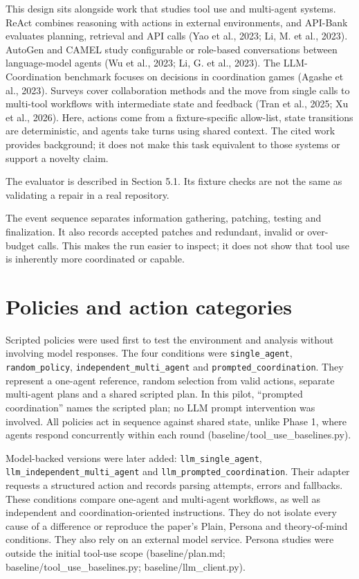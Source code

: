 \documentclass[12pt,a4paper,oneside]{report}
\begin{document}
This design sits alongside work that studies tool use and multi-agent systems. ReAct combines reasoning with actions in external environments, and API-Bank evaluates planning, retrieval and API calls (Yao et al., 2023; Li, M. et al., 2023). AutoGen and CAMEL study configurable or role-based conversations between language-model agents (Wu et al., 2023; Li, G. et al., 2023). The LLM-Coordination benchmark focuses on decisions in coordination games (Agashe et al., 2023). Surveys cover collaboration methods and the move from single calls to multi-tool workflows with intermediate state and feedback (Tran et al., 2025; Xu et al., 2026). Here, actions come from a fixture-specific allow-list, state transitions are deterministic, and agents take turns using shared context. The cited work provides background; it does not make this task equivalent to those systems or support a novelty claim.

The evaluator is described in Section 5.1. Its fixture checks are not the same as validating a repair in a real repository.

The event sequence separates information gathering, patching, testing and finalization. It also records accepted patches and redundant, invalid or over-budget calls. This makes the run easier to inspect; it does not show that tool use is inherently more coordinated or capable.

\section{Policies and action categories}
Scripted policies were used first to test the environment and analysis without involving model responses. The four conditions were \texttt{single\allowbreak\_agent}, \texttt{random\allowbreak\_policy}, \texttt{independent\allowbreak\_multi\allowbreak\_agent} and \texttt{prompted\allowbreak\_coordination}. They represent a one-agent reference, random selection from valid actions, separate multi-agent plans and a shared scripted plan. In this pilot, “prompted coordination” names the scripted plan; no LLM prompt intervention was involved. All policies act in sequence against shared state, unlike Phase 1, where agents respond concurrently within each round (baseline/tool\allowbreak\_use\allowbreak\_baselines.py).

Model-backed versions were later added: \texttt{llm\allowbreak\_single\allowbreak\_agent}, \texttt{llm\allowbreak\_independent\allowbreak\_multi\allowbreak\_agent} and \texttt{llm\allowbreak\_prompted\allowbreak\_coordination}. Their adapter requests a structured action and records parsing attempts, errors and fallbacks. These conditions compare one-agent and multi-agent workflows, as well as independent and coordination-oriented instructions. They do not isolate every cause of a difference or reproduce the paper’s Plain, Persona and theory-of-mind conditions. They also rely on an external model service. Persona studies were outside the initial tool-use scope (baseline/plan.md; baseline/tool\allowbreak\_use\allowbreak\_baselines.py; baseline/llm\allowbreak\_client.py).
\end{document}
